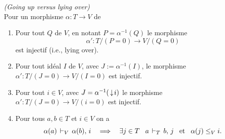 \begin{proposition} \label{propGu} \emph{(Going up versus lying over)}
\\
Pour un morphisme $\alpha:T\to V$ de \trdis \propeq
%
\begin{enumerate}
%
\item  Pour tout \idep $Q$ de $V$, en notant $P=\alpha^{-1}(Q)$ le morphisme 
   $$\alpha':T/(P=0)\to V/(Q=0)$$  
est injectif (i.e., lying over).
%
\item  Pour tout idéal $I$ de $V$, avec $J:=\alpha^{-1}(I)$, le morphisme 
$\alpha':T/(J=0)\to V/(I=0)$ est injectif. 
%
\item  Pour tout $i\in V$, avec $J=\alpha^{-1}(\,\downarrow\! i)$ le morphisme 
$\alpha':T/(J=0)\to V/(i=0)$ est injectif. 
%
\item  Pour tous $a,b\in T$ et $i\in V$ on a
$$
\alpha(a)\,\vdash_{V}\, \alpha(b),\, i \quad\Longrightarrow\quad\exists j\in T \;\;\; a \,\vdash_{T}\, b ,\, j \;\;\; \hbox{et}\;\;\; \alpha(j)\leq_V i.
$$
\end{enumerate} 
\end{proposition}
%
